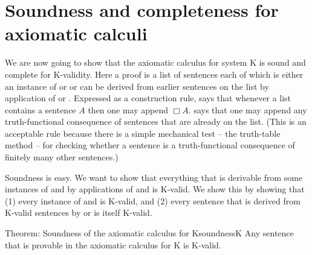 \fi 

\section{Soundness and completeness for axiomatic calculi}
\label{sec:scaxiomatic}

We are now going to show that the axiomatic calculus for system K is sound and
complete for K-validity. Here a proof is a list of sentences each of
which is either an instance of  or  or can be derived from
earlier sentences on the list by application of  or . Expressed
as a construction rule,  says that whenever a list contains a sentence
$A$ then one may append $\Box A$.  says that one may append any
truth-functional consequence of sentences that are already on the list. (This is
an acceptable rule because there is a simple mechanical test -- the truth-table
method -- for checking whether a sentence is a truth-functional consequence of
finitely many other sentences.)

Soundness is easy. We want to show that everything that is derivable from some
instances of  and  by applications of  and  is
K-valid. We show this by showing that (1) every instance of  and 
is K-valid, and (2) every sentence that is derived from K-valid sentences by
 or  is itself K-valid.

\begin{theorem}{Theorem: Soundness of the axiomatic calculus for K}{soundnessK}
  Any sentence that is provable in the axiomatic calculus for K is K-valid.
\end{theorem}

